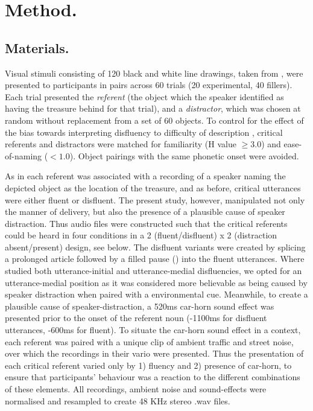 \documentclass[a4paper,man,natbib]{apa6}
\begin{document}
\section{Method.}
\subsection{Materials.}
Visual stimuli consisting of 120 black and white line drawings, taken from \citet{Snodgrass1980}, were presented to participants in pairs across 60 trials (20 experimental, 40 fillers). 
Each trial presented the \textit{referent} (the object which the speaker identified as having the treasure behind for that trial), and a \textit{distractor}, which was chosen at random without replacement from a set of 60 objects. 
To control for the effect of the bias towards interpreting disfluency to difficulty of description \citep{Arnold2007}, critical referents and distractors were matched for familiarity (H value $\ge 3.0$) and ease-of-naming ($<1.0$). 
Object pairings with the same phonetic onset were avoided. 

As in \citet{Loy2016} each referent was associated with a recording of a speaker naming the depicted object as the location of the treasure, and as before, critical utterances were either fluent or disfluent. 
The present study, however, manipulated not only the manner of delivery, but also the presence of a plausible cause of speaker distraction. 
Thus audio files were constructed such that the critical referents could be heard in four conditions in a 2 (fluent/disfluent) x 2 (distraction absent/present) design, see below. 
The disfluent variants were created by splicing a prolonged article followed by a filled pause () into the fluent utterances.
Where \citet{Loy2016} studied both utterance-initial and utterance-medial disfluencies, we opted for an utterance-medial position as it was considered more believable as being caused by speaker distraction when paired with a environmental cue.
Meanwhile, to create a plausible cause of speaker-distraction, a 520ms car-horn sound effect was presented prior to the onset of the referent noun (-1100ms for disfluent utterances, -600ms for fluent). 
To situate the car-horn sound effect in a context, each referent was paired with a unique clip of ambient traffic and street noise, over which the recordings in their vario were presented.
Thus the presentation of each critical referent varied only by 1) fluency and 2) presence of car-horn, to ensure that participants' behaviour was a reaction to the different combinations of these elements. 
All recordings, ambient noise and sound-effects were normalised and resampled to create 48 KHz stereo .wav files.
\end{document}
